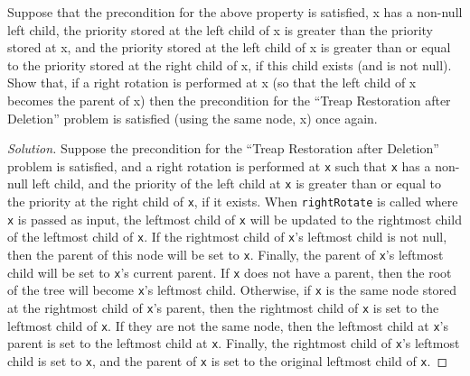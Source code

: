 \documentclass[12pt]{article}
\newenvironment{problem}[2][Problem]{\begin{trivlist}
\item[\hskip \labelsep {\bfseries #1}\hskip \labelsep {\bfseries #2.}]}{\end{trivlist}}
\newenvironment{solution}{\renewcommand\qedsymbol{$\blacksquare$}\begin{proof}[Solution]}{\end{proof}}
\begin{document}
\begin{problem}{7}
    Suppose that the precondition for the above property is satisfied, x has a non-null left child, the priority stored at the left child of x is greater than the priority stored at x, and the priority stored at the left child of x is greater than or equal to the priority stored at the right child of x, if this child exists (and is not null). Show that, if a right rotation is performed at x (so that the left child of x becomes the parent of x) then the precondition for the “Treap Restoration after Deletion” problem is satisfied (using the same node, x) once again.
\end{problem}

\begin{solution}
    Suppose the precondition for the ``Treap Restoration after Deletion'' problem is satisfied, and a right rotation is performed at \texttt{x} such that \texttt{x}
    has a non-null left child, and the priority of the left child at \texttt{x} is greater than or equal to the priority at the right child of \texttt{x}, if it
    exists. When \texttt{rightRotate} is called where \texttt{x} is passed as input, the leftmost child of \texttt{x} will be updated to the rightmost child of the leftmost
    child of \texttt{x}. If the rightmost child of \texttt{x}’s leftmost child is not null, then the parent of this node will be set to \texttt{x}. Finally, the parent of
    \texttt{x}’s leftmost child will be set to \texttt{x}’s current parent. If \texttt{x} does not have a parent, then the root of the tree will become \texttt{x}’s leftmost child.
    Otherwise, if \texttt{x} is the same node stored at the rightmost child of \texttt{x}’s parent, then the rightmost child of \texttt{x} is set to the leftmost child of \texttt{x}.
    If they are not the same node, then the leftmost child at \texttt{x}’s parent is set to the leftmost child at \texttt{x}. Finally, the rightmost child of \texttt{x}’s
    leftmost child is set to \texttt{x}, and the parent of \texttt{x} is set to the original leftmost child of \texttt{x}.
\end{solution}


\begin{problem}{8}
\end{problem}
\end{document}
